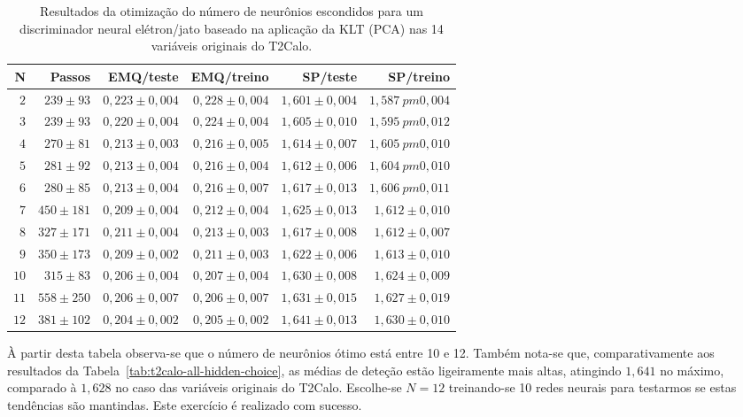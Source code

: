 \begin{table}
\caption{Resultados da otimização do número de neurônios escondidos para um
discriminador neural elétron/jato baseado na aplicação da KLT (PCA) nas 14
variáveis originais do T2Calo.}
\label{tab:t2calo-all-pca-choice}
\begin{center}
\begin{tabular}{|r|r|r|r|r|r|} \hline
N & Passos & EMQ/teste & EMQ/treino & SP/teste & SP/treino \\ \hline 
$2$ & $239\pm93$ & $0,223\pm0,004$ & $0,228\pm0,004$ & $1,601\pm0,004$ & $1,587\
pm0,004$ \\
$3$ & $239\pm93$ & $0,220\pm0,004$ & $0,224\pm0,004$ & $1,605\pm0,010$ & $1,595\
pm0,012$ \\
$4$ & $270\pm81$ & $0,213\pm0,003$ & $0,216\pm0,005$ & $1,614\pm0,007$ & $1,605\
pm0,010$ \\
$5$ & $281\pm92$ & $0,213\pm0,004$ & $0,216\pm0,004$ & $1,612\pm0,006$ & $1,604\
pm0,010$ \\
$6$ & $280\pm85$ & $0,213\pm0,004$ & $0,216\pm0,007$ & $1,617\pm0,013$ & $1,606\
pm0,011$ \\
$7$ & $450\pm181$ & $0,209\pm0,004$ & $0,212\pm0,004$ & $1,625\pm0,013$ & $1,612
\pm0,010$ \\
$8$ & $327\pm171$ & $0,211\pm0,004$ & $0,213\pm0,003$ & $1,617\pm0,008$ & $1,612
\pm0,007$ \\
$9$ & $350\pm173$ & $0,209\pm0,002$ & $0,211\pm0,003$ & $1,622\pm0,006$ & $1,613
\pm0,010$ \\
$10$ & $315\pm83$ & $0,206\pm0,004$ & $0,207\pm0,004$ & $1,630\pm0,008$ & $1,624
\pm0,009$ \\
$11$ & $558\pm250$ & $0,206\pm0,007$ & $0,206\pm0,007$ & $1,631\pm0,015$ & $1,62
7\pm0,019$ \\
$12$ & $381\pm102$ & $0,204\pm0,002$ & $0,205\pm0,002$ & $1,641\pm0,013$ & $1,63
0\pm0,010$ \\
\hline
\end{tabular}
\end{center}
\end{table}

À partir desta tabela observa-se que o número de neurônios ótimo está entre 10
e 12. Também nota-se que, comparativamente aos resultados da
Tabela~\ref{tab:t2calo-all-hidden-choice}, as médias de deteção estão
ligeiramente mais altas, atingindo $1,641$ no máximo, comparado à $1,628$ no
caso das variáveis originais do T2Calo. Escolhe-se $N=12$ treinando-se 10
redes neurais para testarmos se estas tendências são mantindas. Este exercício
é realizado com sucesso.

